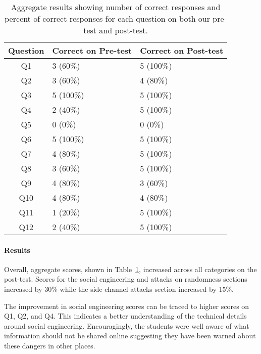 \begin{table}
  \centering
  \scriptsize
  \begin{tabular}{c | l | l}
Question &  Correct on Pre-test   & Correct on Post-test \\
\hline
Q1   & 3 (60\%)  & 5 (100\%) \\
Q2   & 3 (60\%)  & 4 (80\%)  \\
Q3   & 5 (100\%) & 5 (100\%) \\
Q4   & 2 (40\%)  & 5 (100\%) \\
Q5   & 0 (0\%)   & 0 (0\%)   \\
Q6   & 5 (100\%) & 5 (100\%) \\
Q7   & 4 (80\%)  & 5 (100\%) \\
Q8   & 3 (60\%)  & 5 (100\%) \\
Q9   & 4 (80\%)  & 3 (60\%)  \\
Q10  & 4 (80\%)  & 4 (80\%)  \\
Q11  & 1 (20\%)  & 5 (100\%) \\
Q12  & 2 (40\%)  & 5 (100\%) \\
\end{tabular}

\caption{ Aggregate results showing number of correct
  responses and percent of correct responses for
  each question on both our pre-test and post-test.}
\label{fig:results}
\end{table}

\paragraph{Results}Overall, aggregate scores, shown in Table~\ref{fig:results},
increased across all categories on the post-test.
Scores for the social engineering and attacks on randomness sections
increased by 30\% while the side channel attacks section increased by
15\%.

The improvement in social engineering scores can be traced to
higher scores on
Q1, Q2, and Q4.
This indicates a better understanding of the technical details
around social engineering.
Encouragingly, the students were well aware of
what information should not be shared online suggesting they have been
warned about these dangers in other places.

